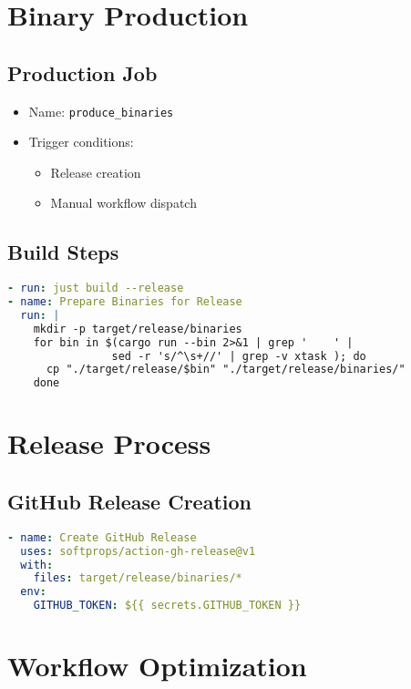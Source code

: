 \documentclass{article}
\begin{document}
\section{Binary Production}

\subsection{Production Job}
\begin{itemize}
    \item Name: \texttt{produce\_binaries}
    \item Trigger conditions:
    \begin{itemize}
        \item Release creation
        \item Manual workflow dispatch
    \end{itemize}
\end{itemize}

\subsection{Build Steps}
\begin{lstlisting}[language=yaml]
- run: just build --release
- name: Prepare Binaries for Release
  run: |
    mkdir -p target/release/binaries
    for bin in $(cargo run --bin 2>&1 | grep '    ' | 
                sed -r 's/^\s+//' | grep -v xtask ); do
      cp "./target/release/$bin" "./target/release/binaries/"
    done
\end{lstlisting}

\section{Release Process}

\subsection{GitHub Release Creation}
\begin{lstlisting}[language=yaml]
- name: Create GitHub Release
  uses: softprops/action-gh-release@v1
  with:
    files: target/release/binaries/*
  env:
    GITHUB_TOKEN: ${{ secrets.GITHUB_TOKEN }}
\end{lstlisting}

\section{Workflow Optimization}
\end{document}
